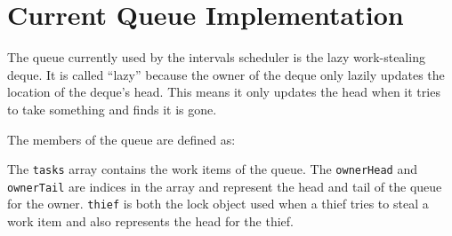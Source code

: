 \section{Current Queue Implementation}
\label{sec:queues-background-current-implementation}

The queue currently used by the intervals scheduler is the lazy
work-stealing deque. It is called ``lazy'' because the owner of the
deque only lazily updates the location of the deque's head. This means
it only updates the head when it tries to take something and finds it
is gone.


The members of the queue are defined as:



The \lstinline!tasks! array contains the work items of the queue. The
\lstinline!ownerHead! and \lstinline!ownerTail! are indices in the
array and represent the head and tail of the queue for the
owner. \lstinline!thief! is both the lock object used when a thief
tries to steal a work item and also represents the head for the thief.









    
      
